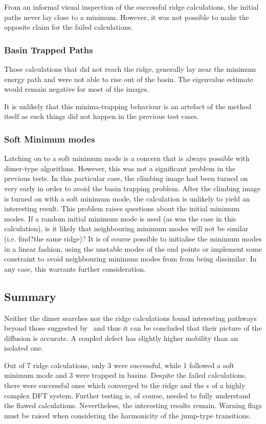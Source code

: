 From an informal visual inspection of the successful ridge calculations, the initial paths never lay close to a minimum.
However, it was not possible to make the opposite claim for the failed calculations.

\subsubsection{Basin Trapped Paths}
Those calculations that did not reach the ridge, generally lay near the minimum energy path and were not able to rise out of the basin.
The eigenvalue estimate would remain negative for most of the images.

It is unlikely that this minima-trapping behaviour is an artefact of the method itself as such things did not happen in the previous test cases.

\subsubsection{Soft Minimum modes}
Latching on to a soft minimum mode is a concern that is always possible with dimer-type algorithms.
However, this was not a significant problem in the previous tests.
In this particular case, the climbing image had been turned on very early in order to avoid the basin trapping problem.
After the climbing image is turned on with a soft minimum mode, the calculation is unlikely to yield an interesting result.
This problem raises questions about the initial minimum modes.
If a random initial minimum mode is used (as was the case in this calculation), is it likely that neighbouring minimum modes will not be similar (i.e. find?the same ridge)?
It is of course possible to initialise the minimum modes in a linear fashion, using the unstable modes of the end points or implement some constraint to avoid neighbouring minimum modes from from being dissimilar.
In any case, this warrants further consideration.

\subsection{Summary}
Neither the dimer searches nor the ridge calculations found interesting pathways beyond those suggested by~\cite{double-defect-2011} and thus it can be concluded that their picture of the diffusion is accurate.
A coupled defect has slightly higher mobility than an isolated one.

Out of 7 ridge calculations, only 3 were successful, while 1 followed a soft minimum mode and 3 were trapped in basins.
Despite the failed calculations, there were successful ones which converged to the ridge and the s of a highly complex DFT system.
Further testing is, of course, needed to fully understand the flawed calculations.
Nevertheless, the interesting results remain.
Warning flags must be raised when considering the harmonicity of the jump-type transitions.

